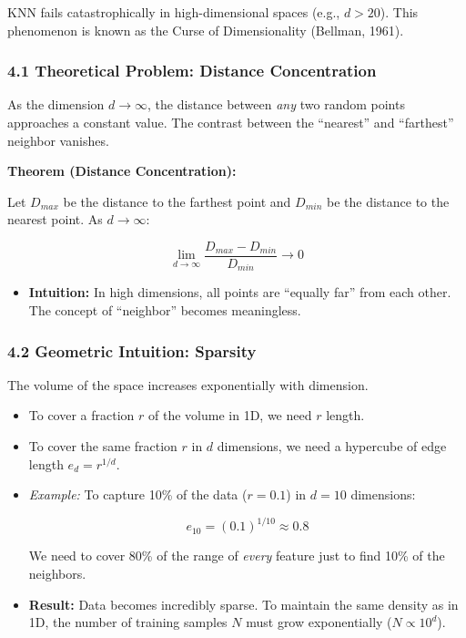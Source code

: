 \documentclass[
  italian,
  11pt,
]{article}
\providecommand{\tightlist}{%
  \setlength{\itemsep}{0pt}\setlength{\parskip}{0pt}}
\begin{document}
KNN fails catastrophically in high-dimensional spaces (e.g.,
\(d > 20\)). This phenomenon is known as the Curse of Dimensionality
(Bellman, 1961).

\subsubsection{4.1 Theoretical Problem: Distance
Concentration}\label{theoretical-problem-distance-concentration}

As the dimension \(d \to \infty\), the distance between \emph{any} two
random points approaches a constant value. The contrast between the
``nearest'' and ``farthest'' neighbor vanishes.

\textbf{Theorem (Distance Concentration):}

Let \(D_{max}\) be the distance to the farthest point and \(D_{min}\) be
the distance to the nearest point. As \(d \to \infty\):

\[\lim_{d \to \infty} \frac{D_{max} - D_{min}}{D_{min}} \to 0\]

\begin{itemize}
\tightlist
\item
  \textbf{Intuition:} In high dimensions, all points are ``equally far''
  from each other. The concept of ``neighbor'' becomes meaningless.
\end{itemize}

\subsubsection{4.2 Geometric Intuition:
Sparsity}\label{geometric-intuition-sparsity}

The volume of the space increases exponentially with dimension.

\begin{itemize}
\item
  To cover a fraction \(r\) of the volume in 1D, we need \(r\) length.
\item
  To cover the same fraction \(r\) in \(d\) dimensions, we need a
  hypercube of edge length \(e_d = r^{1/d}\).
\item
  \emph{Example:} To capture 10\% of the data (\(r=0.1\)) in \(d=10\)
  dimensions:

  \[e_{10} = (0.1)^{1/10} \approx 0.8\]

  We need to cover 80\% of the range of \emph{every} feature just to
  find 10\% of the neighbors.
\item
  \textbf{Result:} Data becomes incredibly sparse. To maintain the same
  density as in 1D, the number of training samples \(N\) must grow
  exponentially (\(N \propto 10^d\)).
\end{itemize}
\end{document}
